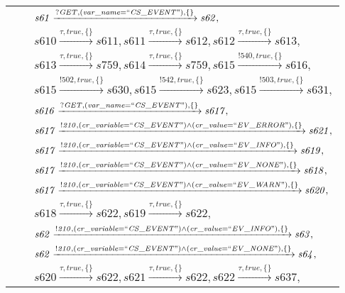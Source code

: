 \begin{tabular}{lcl}
& & $\mathit{s61}\xrightarrow{\mathit{?GET}, \mathit{(var\_name = ``CS\_EVENT")}, \{\}}\mathit{s62},$ \\
& & $\mathit{s610}\xrightarrow{\mathit{\tau}, \mathit{true}, \{\}}\mathit{s611},\mathit{s611}\xrightarrow{\mathit{\tau}, \mathit{true}, \{\}}\mathit{s612},\mathit{s612}\xrightarrow{\mathit{\tau}, \mathit{true}, \{\}}\mathit{s613},$ \\
& & $\mathit{s613}\xrightarrow{\mathit{\tau}, \mathit{true}, \{\}}\mathit{s759},\mathit{s614}\xrightarrow{\mathit{\tau}, \mathit{true}, \{\}}\mathit{s759},\mathit{s615}\xrightarrow{\mathit{!540}, \mathit{true}, \{\}}\mathit{s616},$ \\
& & $\mathit{s615}\xrightarrow{\mathit{!502}, \mathit{true}, \{\}}\mathit{s630},\mathit{s615}\xrightarrow{\mathit{!542}, \mathit{true}, \{\}}\mathit{s623},\mathit{s615}\xrightarrow{\mathit{!503}, \mathit{true}, \{\}}\mathit{s631},$ \\
& & $\mathit{s616}\xrightarrow{\mathit{?GET}, \mathit{(var\_name = ``CS\_EVENT")}, \{\}}\mathit{s617},$ \\
& & $\mathit{s617}\xrightarrow{\mathit{!210}, \mathit{(cr\_variable = ``CS\_EVENT") \land (cr\_value = ``EV\_ERROR")}, \{\}}\mathit{s621},$ \\
& & $\mathit{s617}\xrightarrow{\mathit{!210}, \mathit{(cr\_variable = ``CS\_EVENT") \land (cr\_value = ``EV\_INFO")}, \{\}}\mathit{s619},$ \\
& & $\mathit{s617}\xrightarrow{\mathit{!210}, \mathit{(cr\_variable = ``CS\_EVENT") \land (cr\_value = ``EV\_NONE")}, \{\}}\mathit{s618},$ \\
& & $\mathit{s617}\xrightarrow{\mathit{!210}, \mathit{(cr\_variable = ``CS\_EVENT") \land (cr\_value = ``EV\_WARN")}, \{\}}\mathit{s620},$ \\
& & $\mathit{s618}\xrightarrow{\mathit{\tau}, \mathit{true}, \{\}}\mathit{s622},\mathit{s619}\xrightarrow{\mathit{\tau}, \mathit{true}, \{\}}\mathit{s622},$ \\
& & $\mathit{s62}\xrightarrow{\mathit{!210}, \mathit{(cr\_variable = ``CS\_EVENT") \land (cr\_value = ``EV\_INFO")}, \{\}}\mathit{s63},$ \\
& & $\mathit{s62}\xrightarrow{\mathit{!210}, \mathit{(cr\_variable = ``CS\_EVENT") \land (cr\_value = ``EV\_NONE")}, \{\}}\mathit{s64},$ \\
& & $\mathit{s620}\xrightarrow{\mathit{\tau}, \mathit{true}, \{\}}\mathit{s622},\mathit{s621}\xrightarrow{\mathit{\tau}, \mathit{true}, \{\}}\mathit{s622},\mathit{s622}\xrightarrow{\mathit{\tau}, \mathit{true}, \{\}}\mathit{s637},$ \\

\end{tabular}
